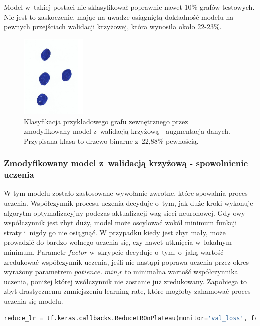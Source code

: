 Model w~takiej postaci nie sklasyfikował poprawnie nawet 10\% grafów testowych.
Nie jest to zaskoczenie, mając na uwadze osiągniętą dokładność modelu na pewnych przejściach walidacji krzyżowej,
która wynosiła około 22-23\%.

\begin{figure}[ht]
	\centering
	\includegraphics[height=4cm]{../graph_classification/test_graphs/drawn/empty-8.png}
	\caption{Klasyfikacja przykładowego grafu zewnętrznego przez zmodyfikowany model z~walidacją krzyżową - augmentacja danych.
		Przypisana klasa to drzewo binarne z~22,88\% pewnością.}
	\label{Fig:tests-cv-3d}
\end{figure}
\FloatBarrier

\subsubsection{Zmodyfikowany model z~walidacją krzyżową - spowolnienie uczenia}

W tym modelu zostało zastosowane wywołanie zwrotne, które spowalnia proces uczenia.
Współczynnik procesu uczenia decyduje o~tym, jak duże kroki wykonuje algorytm optymalizacyjny podczas aktualizacji wag sieci neuronowej.
Gdy owy współczynnik jest zbyt duży, model może oscylować wokół minimum funkcji straty i~nigdy go nie osiągnąć.
W przypadku kiedy jest zbyt mały, może prowadzić do bardzo wolnego uczenia się, czy nawet utknięcia w~lokalnym minimum.
Parametr $factor$ w~skrypcie decyduje o~tym, o~jaką wartość zredukować współczynnik uczenia,
jeśli nie nastąpi poprawa uczenia przez okres wyrażony parametrem $patience$.
$min_lr$ to minimalna wartość współczynnika uczenia, poniżej której wsółczynnik nie zostanie już zredukowany.
Zapobiega to zbyt drastycznemu zmniejszeniu learning rate, które mogłoby zahamować proces uczenia się modelu.

\begin{lstlisting}[language=Python,caption=Listing zmodyfikowanego skryptu
	znajdującego się bezpośrdenio po tworzeniu modelu z~walidacją krzyżową - wersja 4,label={tests-model-crossval4}]
	reduce_lr = tf.keras.callbacks.ReduceLROnPlateau(monitor='val_loss', factor=0.2, patience=5, min_lr=0.001)
\end{lstlisting}

